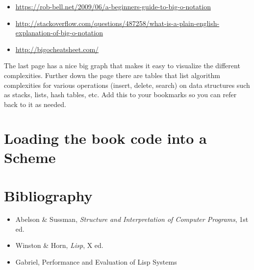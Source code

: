 \documentclass[12pt,openright,draft]{book}
\begin{document}
\begin{itemize}
\item \url{https://rob-bell.net/2009/06/a-beginners-guide-to-big-o-notation}

\item \url{http://stackoverflow.com/questions/487258/what-is-a-plain-english-explanation-of-big-o-notation}

\item \url{http://bigocheatsheet.com/}
\end{itemize}

The last page has a nice big graph that makes it easy to visualize the
different complexities.  Further down the page there are tables that
list algorithm complexities for various operations (insert, delete,
search) on data structures such as stacks, lists, hash tables, etc.
Add this to your bookmarks so you can refer back to it as needed.

\appendix
\chapter{Loading the book code into a Scheme}


\backmatter{}
\chapter{Bibliography}

\begin{itemize}
\item Abelson \& Sussman, \emph{Structure and Interpretation of Computer Programs}, 1st ed.

\item Winston \& Horn, \emph{Lisp}, X ed.

\item Gabriel, Performance and Evaluation of Lisp Systems
\end{itemize}
\end{document}
